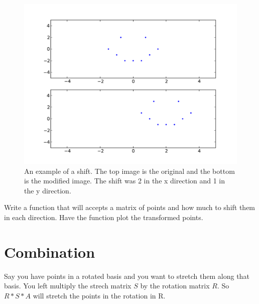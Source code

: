 \begin{figure}[H]
\includegraphics[scale = .5]{shift.pdf}
\caption{An example of a shift. The top image is the original and the bottom is the modified image. The shift was 2 in the x direction and 1 in the y direction.}
\end{figure}

\begin{problem}
Write a function that will accepts a matrix of points and how much to shift them in each direction. Have the function plot the transformed points.
\end{problem}

\section*{Combination}
Say you have points in a rotated basis and you want to stretch them along that basis. You left multiply the strech matrix $S$ by the rotation matrix $R$. So $R*S*A$ will stretch the points in the rotation in R. 

